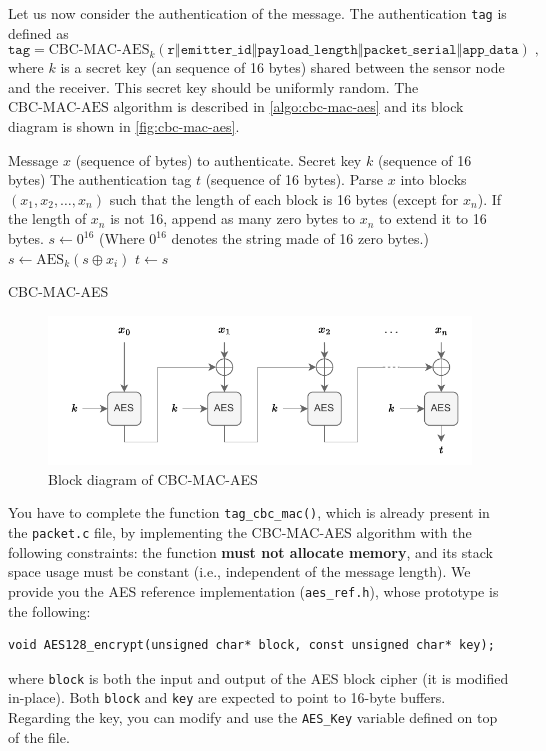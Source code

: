Let us now consider the authentication of the message. The authentication
\texttt{tag} is defined as
\[
    \texttt{tag} = \text{CBC-MAC-AES}_{k}\left(
        \texttt{r$\mathbin\Vert$emitter\_id$\mathbin\Vert$payload\_length$\mathbin\Vert$packet\_serial$\mathbin\Vert$app\_data}
    \right)\;,
\]
where $k$ is a secret key (an sequence of 16 bytes) shared between the sensor
node and the receiver. This secret key should be uniformly random. The $\text{CBC-MAC-AES}$ algorithm is described in \autoref{algo:cbc-mac-aes} and its block diagram is shown in \autoref{fig:cbc-mac-aes}.
\begin{algorithm}
\begin{algorithmic}
    \REQUIRE Message $x$ (sequence of bytes) to authenticate.
    \REQUIRE Secret key $k$ (sequence of 16 bytes)
    \ENSURE The authentication tag $t$ (sequence of 16 bytes).
    \STATE Parse $x$ into blocks $\left(x_1,x_2,\dots,x_n\right)$ such that the
    length of each block is 16 bytes (except for $x_n$).
    \STATE If the length of $x_n$ is not 16, append as many zero bytes to $x_n$
    to extend it to 16 bytes.
    \STATE $s \leftarrow 0^{16}$ (Where $0^{16}$ denotes the string made of 16 zero bytes.)
    \STATE $s \leftarrow \text{AES}_k(s \oplus x_i)$
    \ENDFOR
    \STATE $t \leftarrow s$
\end{algorithmic}
\caption{CBC-MAC-AES}
\label{algo:cbc-mac-aes}
\end{algorithm}

\begin{figure}[h]
\centering
\includegraphics[scale=1]{figures/crypto_cbc_mac_aes.pdf}
\caption{Block diagram of CBC-MAC-AES}
\label{fig:cbc-mac-aes}
\end{figure}

You have to complete the function \texttt{tag\_cbc\_mac()}, which is already present in the \texttt{packet.c} file, by implementing the CBC-MAC-AES algorithm with the following constraints: the function \textbf{must not allocate memory}, and its stack space usage must be constant (i.e., independent of the message length).
We provide you the AES reference implementation (\texttt{aes\_ref.h}), whose
prototype is the following:
\begin{lstlisting}[style=customc]
void AES128_encrypt(unsigned char* block, const unsigned char* key);
\end{lstlisting}
where \texttt{block} is both the input and output of the AES block cipher (it
is modified in-place).
Both \texttt{block} and \texttt{key} are expected to point to 16-byte buffers. Regarding the key, you can modify and use the \texttt{AES\_Key} variable defined on top of the file.

